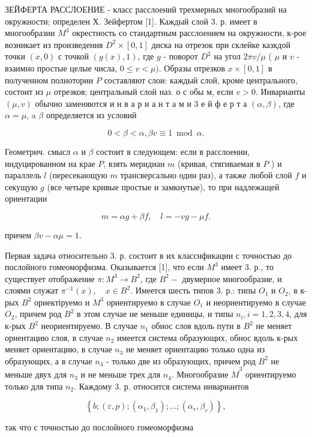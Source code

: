 \documentclass[10pt]{article}
\begin{document}
ЗЕЙФЕРТА РАССЛОЕНИЕ - класс расслоений трехмерных многообразий на окружности; определен Х. Зейфертом [1]. Каждый слой 3. р. имеет в многообразии $M^{3}$ окрестность со стандартным расслоением на окружности, к-рое возникает из произведения $D^{2} \times[0,1]$ диска на отрезок при склейке казкдой точки $(x, 0)$ с точкой $(g(x), 1)$, где $g$ - поворот $D^{2}$ на угол $2 \pi v / \mu$ ( $\mu$ и $v$ - взаимно простые целые числа, $0 \leqslant v<\mu)$. Образы отрезков $x \times[0,1]$ в полученном полнотории $P$ составляют слои: каждый слой, кроме центрального, состоит из $\mu$ отрезков; центральный слой наз. о с обы м, если $v>0$. Инварианты $(\mu, v)$ обычно заменяются и н в а р и а н т а м и 3 е й ф е р т а $(\alpha, \beta)$, где $\alpha=\mu$, a $\beta$ определяется из условий



\[

0<\beta<\alpha, \beta v \equiv 1 \bmod \alpha .

\]



Геометрич. смысл $\alpha$ и $\beta$ состоит в следующем: если в расслоении, индуцированном на крае $P$, взять меридиан $m$ (кривая, стягиваемая в $P$ ) и параллель $l$ (пересекающую $m$ трансверсально один раз), а также любой слой $f$ и секущую $g$ (все четыре кривые простые и замкнутые), то при надлежащей ориентации



\[

m=\alpha g+\beta f, \quad l=-v g-\mu f .

\]



причем $\beta v-\alpha \mu=1$.



Первая задача относительно 3. р. состоит в их классификации с точностью до послойного гомеоморфизма. Оказывается [1], что если $M^{3}$ имеет 3. р., то существует отображение $\pi: M^{3} \rightarrow B^{2}$, где $B^{2}-$ двумерное многообразие, и слоями служат $\pi^{-1}(x), \quad x \in B^{2}$. Имеется шесть типов 3. р.: типы $O_{1}$ и $O_{2}$, в к-рых $B^{2}$ ориектіруемо и $M^{3}$ ориентируемо в случае $O_{1}$ и неориентируемо в случае $O_{2}$, причем род $B^{2}$ в этом случае не меньше единицы, и типы $n_{i}, i=1,2,3,4$, для к-рых $B^{2}$ неориентируемо. В случае $n_{1}$ обнос слоя вдоль пути в $B^{2}$ не меняет ориентацию слоя, в случае $n_{2}$ имеется система образующих, обнос вдоль к-рых меняет ориентацию, в случае $n_{3}$ не меняет ориентацию только одна из образующих, а в случае $n_{4}$ - только две из образующих, причем род $B^{2}$ не меньше двух для $n_{3}$ и не меньше трех для $n_{4}$. Многообразие $\dot{M}^{3}$ ориентируемо только для типа $n_{2}$. Каждому 3. р. относится система инвариантов



\[

\left\{b ;(\varepsilon, p) ;\left(\alpha_{1}, \beta_{1}\right) ; \ldots ;\left(\alpha_{r}, \beta_{r}\right)\right\},

\]



так что с точностью до послойного гомеоморфизма
\end{document}
